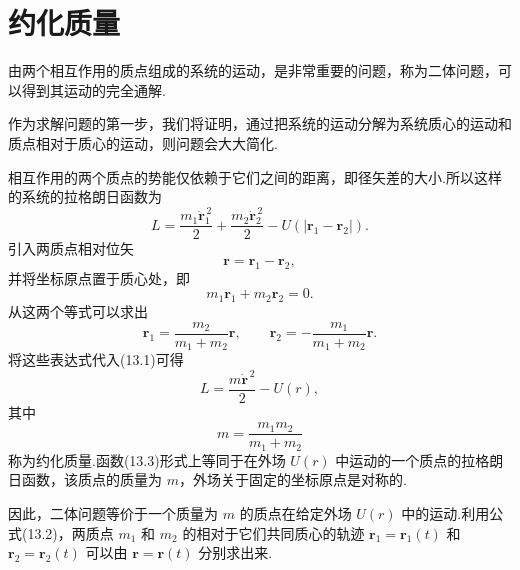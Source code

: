 \section{约化质量}

由两个相互作用的质点组成的系统的运动，是非常重要的问题，称为二体问题，可以得到其运动的完全通解.

作为求解问题的第一步，我们将证明，通过把系统的运动分解为系统质心的运动和质点相对于质心的运动，则问题会大大简化.

相互作用的两个质点的势能仅依赖于它们之间的距离，即径矢差的大小.所以这样的系统的拉格朗日函数为
\begin{equation}
  L=\frac{m_1\dot{\boldsymbol{r}}_1^{\,2}}{2}
  +\frac{m_2\dot{\boldsymbol{r}}_2^{\,2}}{2}
  -U\left(\left|\boldsymbol{r}_1-\boldsymbol{r}_2\right|\right).
\end{equation}
引入两质点相对位矢
\begin{equation*}
  \boldsymbol{r}=\boldsymbol{r}_1-\boldsymbol{r}_2,
\end{equation*}
并将坐标原点置于质心处，即
\begin{equation*}
  m_1\boldsymbol{r}_1+m_2\boldsymbol{r}_2=0.
\end{equation*}
从这两个等式可以求出
\begin{equation}
  \boldsymbol{r}_1=\frac{m_2}{m_1+m_2}\boldsymbol{r},\qquad
  \boldsymbol{r}_2=-\frac{m_1}{m_1+m_2}\boldsymbol{r}.
\end{equation}
将这些表达式代入(13.1)可得
\begin{equation}
  L=\frac{m\dot{\boldsymbol{r}}^{\,2}}{2}-U(r),
\end{equation}
其中
\begin{equation}
  m=\frac{m_1m_2}{m_1+m_2}
\end{equation}
称为约化质量.函数(13.3)形式上等同于在外场 $U(r)$ 中运动的一个质点的拉格朗日函数，该质点的质量为 $m$，外场关于固定的坐标原点是对称的.

因此，二体问题等价于一个质量为 $m$ 的质点在给定外场 $U(r)$ 中的运动.利用公式(13.2)，两质点 $m_1$ 和 $m_2$ 的相对于它们共同质心的轨迹 $\boldsymbol{r}_1=\boldsymbol{r}_1(t)$ 和 $\boldsymbol{r}_2=\boldsymbol{r}_2(t)$ 可以由 $\boldsymbol{r}=\boldsymbol{r}(t)$ 分别求出来.

